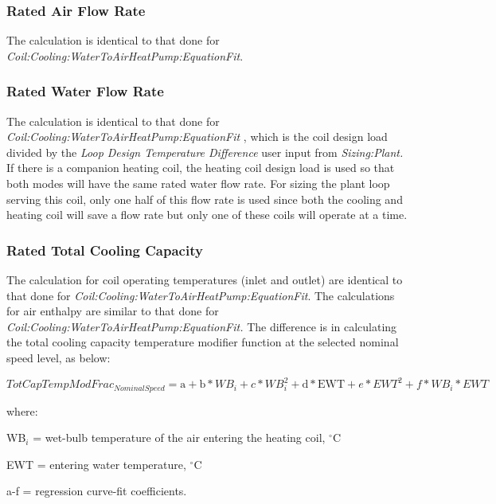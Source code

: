 \subsubsection{Rated Air Flow Rate}\label{rated-air-flow-rate-1}

The calculation is identical to that done for \emph{Coil:Cooling:WaterToAirHeatPump:EquationFit}.

\subsubsection{Rated Water Flow Rate}\label{rated-water-flow-rate-1}

The calculation is identical to that done for \emph{Coil:Cooling:WaterToAirHeatPump:EquationFit} , which is the coil design load divided by the \emph{Loop Design Temperature Difference} user input from \emph{Sizing:Plant.} If there is a companion heating coil, the heating coil design load is used so that both modes will have the same rated water flow rate. For sizing the plant loop serving this coil, only one half of this flow rate is used since both the cooling and heating coil will save a flow rate but only one of these coils will operate at a time.

\subsubsection{Rated Total Cooling Capacity}\label{rated-total-cooling-capacity-1}

The calculation for coil operating temperatures (inlet and outlet) are identical to that done for \emph{Coil:Cooling:WaterToAirHeatPump:EquationFit}. The calculations for air enthalpy are similar to that done for \emph{Coil:Cooling:WaterToAirHeatPump:EquationFit.} The difference is in calculating the total cooling capacity temperature modifier function at the selected nominal speed level, as below:

\begin{equation}
TotCapTempModFra{c_{NominalSpeed}} = {\mathrm{a}} + {\mathrm{b*}}W{B_i} + c*WB_i^2 + {\mathrm{d*EWT}} + e*EW{T^2} + f*W{B_i}*EWT
\end{equation}

where:

WB\(_{i}\) = wet-bulb temperature of the air entering the heating coil, \(^{\circ}\)C

EWT = entering water temperature, \(^{\circ}\)C

a-f = regression curve-fit coefficients.

